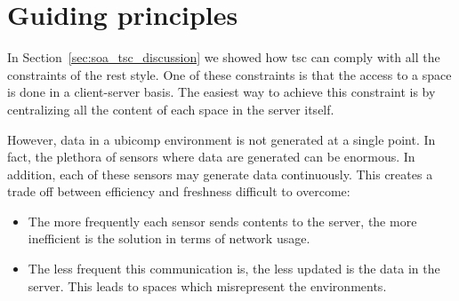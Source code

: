 \section{Guiding principles} %
\label{sec:guiding_principles}

In Section~\ref{sec:soa_tsc_discussion} we showed how \ac{tsc} can comply with all the constraints of the \ac{rest} style.
One of these constraints is that the access to a space is done in a client-server basis.
The easiest way to achieve this constraint is by centralizing all the content of each space in the server itself.


However, data in a \ac{ubicomp} environment is not generated at a single point. %
In fact, the plethora of sensors where data are generated can be enormous. %
In addition, each of these sensors may generate data continuously.
This creates a trade off between efficiency and freshness difficult to overcome:
\begin{itemize}
  \item The more frequently each sensor sends contents to the server, the more inefficient is the solution in terms of network usage.
  \item The less frequent this communication is, the less updated is the data in the server.
        This leads to spaces which misrepresent the environments.
\end{itemize}



